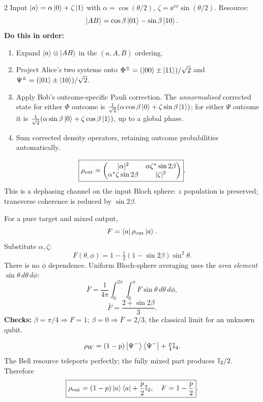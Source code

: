 \begin{multicols}{2}
\columnbreak
{}
Input $\left\lvert a\right\rangle=\alpha\left\lvert 0\right\rangle+\zeta\left\lvert 1\right\rangle$ with $\alpha=\cos(\theta/2)$, $\zeta=\ee^{i\phi}\sin(\theta/2)$. Resource:
\[\left\lvert AB\right\rangle=\cos\beta\left\lvert 01\right\rangle-\sin\beta\left\lvert 10\right\rangle.\]
\textbf{Do this in order:}
\begin{enumerate}
\item Expand $\left\lvert a\right\rangle\otimes\left\lvert AB\right\rangle$ in the $(a,A,B)$ ordering.
\item Project Alice's two systems onto $\Phi^\pm=(\left\lvert 00\right\rangle\pm\left\lvert 11\right\rangle)/\sqrt2$ and $\Psi^\pm=(\left\lvert 01\right\rangle\pm\left\lvert 10\right\rangle)/\sqrt2$.
\item Apply Bob's outcome-specific Pauli correction. The \emph{unnormalised} corrected state for either $\Phi$ outcome is $\tfrac1{\sqrt2}(\alpha\cos\beta\left\lvert 0\right\rangle+\zeta\sin\beta\left\lvert 1\right\rangle)$; for either $\Psi$ outcome it is $\tfrac1{\sqrt2}(\alpha\sin\beta\left\lvert 0\right\rangle+\zeta\cos\beta\left\lvert 1\right\rangle)$, up to a global phase.
\item Sum corrected density operators, retaining outcome probabilities automatically.
\end{enumerate}
\[\boxed{\rho_{\rm out}=\begin{pmatrix}|\alpha|^2&\alpha\zeta^*\sin2\beta\\ \alpha^*\zeta\sin2\beta&|\zeta|^2\end{pmatrix}}.\]
This is a dephasing channel on the input Bloch sphere: $z$ population is preserved; transverse coherence is reduced by $\sin2\beta$.

For a pure target and mixed output,
\[F=\left\langle a\right\rvert\rho_{\rm out}\left\lvert a\right\rangle.
\]
Substitute $\alpha,\zeta$:
\[\boxed{F(\theta,\phi)=1-\tfrac12(1-\sin2\beta)\sin^2\theta}.\]
There is no $\phi$ dependence. Uniform Bloch-sphere averaging uses the \emph{area element} $\sin\theta\,d\theta\,d\phi$:
\[\bar F=\frac1{4\pi}\int_0^{2\pi}\!\int_0^\pi F\sin\theta\,d\theta\,d\phi,\]
\[\boxed{\bar F=\frac{2+\sin2\beta}{3}}.\]
\textbf{Checks:} $\beta=\pi/4\Rightarrow F=1$; $\beta=0\Rightarrow \bar F=2/3$, the classical limit for an unknown qubit.

\[\rho_W=(1-p)\left\lvert \Psi^-\right\rangle\left\langle \Psi^-\right\rvert+\tfrac p4\mathbb I_4.\]
The Bell resource teleports perfectly; the fully mixed part produces $\mathbb I_2/2$. Therefore
\[\boxed{\rho_{\rm out}=(1-p)\left\lvert a\right\rangle\left\langle a\right\rvert+\frac p2\mathbb I_2,\quad F=1-\frac p2}.\]
\end{multicols}